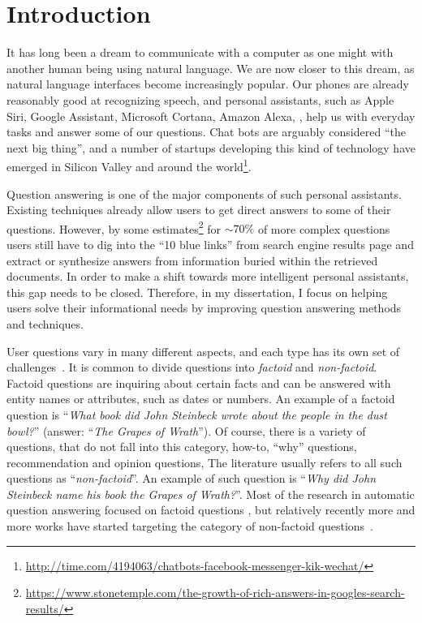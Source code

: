 \chapter{Introduction}
\setcounter{page}{1}

It has long been a dream to communicate with a computer as one might with another human being using natural language.
We are now closer to this dream, as natural language interfaces become increasingly popular.
Our phones are already reasonably good at recognizing speech, and personal assistants, such as Apple Siri, Google Assistant, Microsoft Cortana, Amazon Alexa, \etc, help us with everyday tasks and answer some of our questions.
Chat bots are arguably considered ``the next big thing'', and a number of startups developing this kind of technology have emerged in Silicon Valley and around the world\footnote{\href{url}{http://time.com/4194063/chatbots-facebook-messenger-kik-wechat/}}.

Question answering is one of the major components of such personal assistants.
Existing techniques already allow users to get direct answers to some of their questions.
However, by some estimates\footnote{\href{url}{https://www.stonetemple.com/the-growth-of-rich-answers-in-googles-search-results/}} for $\sim 70\%$ of more complex questions users still have to dig into the ``10 blue links'' from search engine results page and extract or synthesize answers from information buried within the retrieved documents.
In order to make a shift towards more intelligent personal assistants, this gap needs to be closed.
Therefore, in my dissertation, I focus on helping users solve their informational needs by improving question answering methods and techniques.

User questions vary in many different aspects, and each type has its own set of challenges~\cite{voorhees2001trec,yang2016beyond}.
It is common to divide questions into \textit{factoid} and \textit{non-factoid}.
Factoid questions are inquiring about certain facts and can be answered with entity names or attributes, such as dates or numbers.
An example of a factoid question is ``\textit{What book did John Steinbeck wrote about the people in the dust bowl?}'' (answer: ``\textit{The Grapes of Wrath}'').
Of course, there is a variety of questions, that do not fall into this category, \eg how-to, ``why'' questions, recommendation and opinion questions, \etc
The literature usually refers to all such questions as ``\textit{non-factoid}''.
An example of such question is ``\textit{Why did John Steinbeck name his book the Grapes of Wrath?}''.
Most of the research in automatic question answering focused on factoid questions \cite{BerantCFL13:sempre,Cafarella:2008:WEP:1453856.1453916,voorhees2001trec,lin2007exploration}, but relatively recently more and more works have started targeting the category of non-factoid questions~\cite{overviewliveqa15,cohen2016end,fried2015higher,surdeanu2011learning,sharp2015spinning,tymoshenko2016learning,yang2016beyond}.

